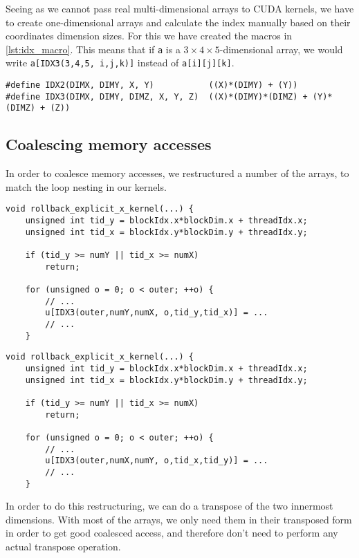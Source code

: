 \documentclass[a4paper]{article}
\begin{document}
Seeing as we cannot pass real multi-dimensional arrays to CUDA kernels, we have
to create one-dimensional arrays and calculate the index manually based on
their coordinates dimension sizes. For this we have created the macros in
\autoref{lst:idx_macro}. This means that if \texttt{a} is a $3 \times 4 \times
5$-dimensional array, we would write \verb|a[IDX3(3,4,5, i,j,k)]| instead of
\verb|a[i][j][k]|.

\begin{lstlisting}[caption={Calculating array indices.},label={lst:idx_macro}]
#define IDX2(DIMX, DIMY, X, Y)           ((X)*(DIMY) + (Y))
#define IDX3(DIMX, DIMY, DIMZ, X, Y, Z)  ((X)*(DIMY)*(DIMZ) + (Y)*(DIMZ) + (Z))
\end{lstlisting}

\subsection{Coalescing memory accesses}

In order to coalesce memory accesses, we restructured a number of the arrays,
to match the loop nesting in our kernels. 

\begin{lstlisting}[caption={\texttt{rollback}'s ``explicit x'' kernel pre-coalescing.},label={lst:coalesce1}]
void rollback_explicit_x_kernel(...) {
    unsigned int tid_y = blockIdx.x*blockDim.x + threadIdx.x;
    unsigned int tid_x = blockIdx.y*blockDim.y + threadIdx.y;

    if (tid_y >= numY || tid_x >= numX)
        return;

    for (unsigned o = 0; o < outer; ++o) {
        // ...
        u[IDX3(outer,numY,numX, o,tid_y,tid_x)] = ...
        // ...
    }
\end{lstlisting}

\begin{lstlisting}[caption={\texttt{rollback}'s ``explicit x'' kernel post-coalescing.},label={lst:coalesce2}]
void rollback_explicit_x_kernel(...) {
    unsigned int tid_y = blockIdx.x*blockDim.x + threadIdx.x;
    unsigned int tid_x = blockIdx.y*blockDim.y + threadIdx.y;

    if (tid_y >= numY || tid_x >= numX)
        return;

    for (unsigned o = 0; o < outer; ++o) {
        // ...
        u[IDX3(outer,numX,numY, o,tid_x,tid_y)] = ...
        // ...
    }
\end{lstlisting}

In order to do this restructuring, we can do a transpose of the two innermost
dimensions. With most of the arrays, we only need them in their transposed
form in order to get good coalesced access, and therefore don't need to
perform any actual transpose operation.
\end{document}
